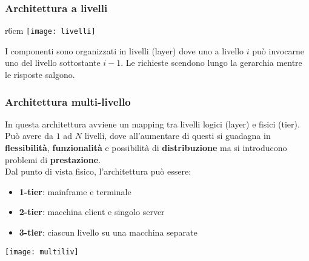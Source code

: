 \subsubsection{Architettura a livelli}
\begin{wrapfigure}[9]{r}{6cm}
	\vspace{-1cm}
	\texttt{[image: livelli]}
\end{wrapfigure}
I componenti sono organizzati in livelli (layer) dove uno a livello $i$ può invocarne uno del livello sottostante $i-1$. Le richieste scendono lungo la gerarchia mentre le risposte salgono.

\subsubsection{Architettura multi-livello}
In questa architettura avviene un mapping tra livelli logici (layer) e fisici (tier). Può avere da $1$ ad $N$ livelli, dove all'aumentare di questi si guadagna in \textbf{flessibilità}, \textbf{funzionalità} e possibilità di \textbf{distribuzione} ma si introducono problemi di \textbf{prestazione}. \\
Dal punto di vista fisico, l'architettura può essere:
\begin{itemize}
	\item \textbf{1-tier}: mainframe e terminale
	\item \textbf{2-tier}: macchina client e singolo server
	\item \textbf{3-tier}: ciascun livello su una macchina separate
\end{itemize}
\begin{center}
	\texttt{[image: multiliv]}
\end{center}